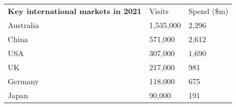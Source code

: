 \begin{tabular}[t]{p{4.7cm}>{\hfill}p{1.1cm}>{\hfill}p{1.7cm}}
 \textbf{Key international markets in 2021} & Visits & Spend (\$m) \\ 
 Australia & 1,535,000 & 2,296 \\ 
  China &   571,000 & 2,612 \\ 
  USA &   307,000 & 1,690 \\ 
  UK &   217,000 & 981 \\ 
  Germany &   118,000 & 675 \\ 
  Japan &    90,000 & 191 \\ 
  \end{tabular}
